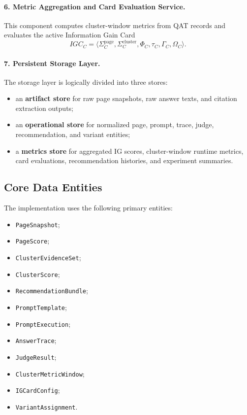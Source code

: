 \documentclass{article}
\begin{document}
\paragraph{6. Metric Aggregation and Card Evaluation Service.}
This component computes cluster-window metrics from QAT records and evaluates the active Information Gain Card
\[
IGC_C = \langle \Sigma_C^{\text{page}}, \Sigma_C^{\text{cluster}}, \Phi_C, \tau_C, \Gamma_C, \Omega_C \rangle.
\]

\paragraph{7. Persistent Storage Layer.}
The storage layer is logically divided into three stores:
\begin{itemize}
    \item an \textbf{artifact store} for raw page snapshots, raw answer texts, and citation extraction outputs;
    \item an \textbf{operational store} for normalized page, prompt, trace, judge, recommendation, and variant entities;
    \item a \textbf{metrics store} for aggregated IG scores, cluster-window runtime metrics, card evaluations, recommendation histories, and experiment summaries.
\end{itemize}

\subsection{Core Data Entities}

The implementation uses the following primary entities:
\begin{itemize}
    \item \texttt{PageSnapshot};
    \item \texttt{PageScore};
    \item \texttt{ClusterEvidenceSet};
    \item \texttt{ClusterScore};
    \item \texttt{RecommendationBundle};
    \item \texttt{PromptTemplate};
    \item \texttt{PromptExecution};
    \item \texttt{AnswerTrace};
    \item \texttt{JudgeResult};
    \item \texttt{ClusterMetricWindow};
    \item \texttt{IGCardConfig};
    \item \texttt{VariantAssignment}.
\end{itemize}
\end{document}
